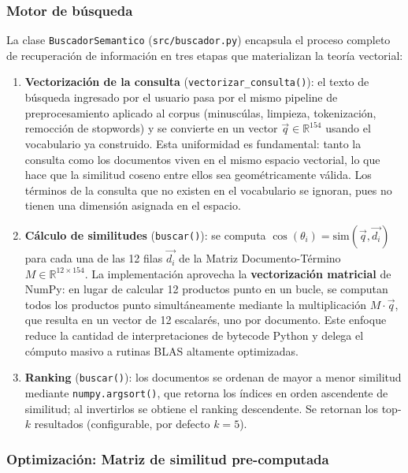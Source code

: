 \subsubsection{Motor de búsqueda}

La clase \texttt{BuscadorSemantico} (\texttt{src/buscador.py}) encapsula el proceso completo de recuperación de información en tres etapas que materializan la teoría vectorial:

\begin{enumerate}
    \item \textbf{Vectorización de la consulta} (\texttt{vectorizar\_consulta()}): el texto de búsqueda ingresado por el usuario pasa por el mismo pipeline de preprocesamiento aplicado al corpus (minuscúlas, limpieza, tokenización, remocción de stopwords) y se convierte en un vector $\vec{q} \in \mathbb{R}^{154}$ usando el vocabulario ya construido. Esta uniformidad es fundamental: tanto la consulta como los documentos viven en el mismo espacio vectorial, lo que hace que la similitud coseno entre ellos sea geométricamente válida. Los términos de la consulta que no existen en el vocabulario se ignoran, pues no tienen una dimensión asignada en el espacio.

    \item \textbf{Cálculo de similitudes} (\texttt{buscar()}): se computa $\cos(\theta_i) = \text{sim}(\vec{q}, \vec{d_i})$ para cada una de las 12 filas $\vec{d_i}$ de la Matriz Documento-Término $M \in \mathbb{R}^{12 \times 154}$. La implementación aprovecha la \textbf{vectorización matricial} de NumPy: en lugar de calcular 12 productos punto en un bucle, se computan todos los productos punto simultáneamente mediante la multiplicación $M \cdot \vec{q}$, que resulta en un vector de 12 escalarés, uno por documento. Este enfoque reduce la cantidad de interpretaciones de bytecode Python y delega el cómputo masivo a rutinas BLAS altamente optimizadas.

    \item \textbf{Ranking} (\texttt{buscar()}): los documentos se ordenan de mayor a menor similitud mediante \texttt{numpy.argsort()}, que retorna los índices en orden ascendente de similitud; al invertirlos se obtiene el ranking descendente. Se retornan los top-$k$ resultados (configurable, por defecto $k=5$).
\end{enumerate}

\subsubsection{Optimización: Matriz de similitud pre-computada}

